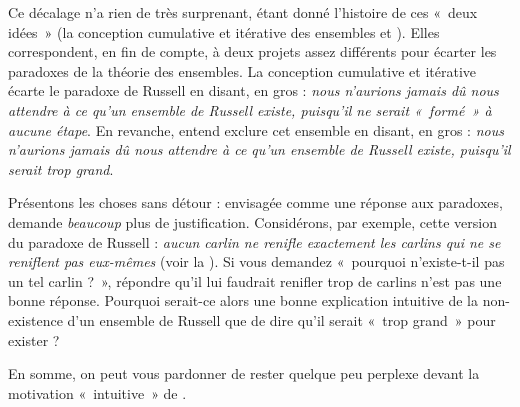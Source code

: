 \documentclass[../../../include/open-logic-section]{subfiles}
\begin{document}
Ce décalage n'a rien de très surprenant, étant donné l'histoire
de ces «~deux idées~» (la conception cumulative et itérative des
ensembles et \limofsize). Elles correspondent, en fin de compte,
à deux projets assez différents pour écarter les paradoxes de
la théorie des ensembles. La conception cumulative et itérative
écarte le paradoxe de Russell en disant, en gros :
\emph{nous n'aurions jamais dû nous attendre à ce qu'un ensemble
de Russell existe, puisqu'il ne serait «~formé~» à aucune étape}.
En revanche, \limofsize{} entend exclure cet ensemble en disant,
en gros : \emph{nous n'aurions jamais dû nous attendre à ce qu'un
ensemble de Russell existe, puisqu'il serait trop grand}.

Présentons les choses sans détour : envisagée comme une réponse
aux paradoxes, \limofsize{} demande \emph{beaucoup} plus de
justification. Considérons, par exemple, cette version du
paradoxe de Russell : \emph{aucun carlin ne renifle exactement
les carlins qui ne se reniflent pas eux-mêmes} (voir la
). Si vous demandez «~pourquoi
n'existe-t-il pas un tel carlin ?~», répondre qu'il lui
faudrait renifler trop de carlins n'est pas une bonne réponse.
Pourquoi serait-ce alors une bonne explication intuitive
de la non-existence d'un ensemble de Russell que de dire
qu'il serait «~trop grand~» pour exister ?

En somme, on peut vous pardonner de rester quelque peu perplexe
devant la motivation «~intuitive~» de \limofsize.
\end{document}

